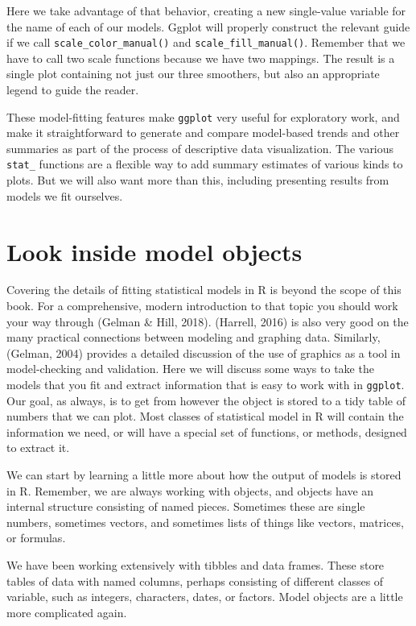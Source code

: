 \documentclass[]{book}
\begin{document}
Here we take advantage of that behavior, creating a new single-value variable for the name of each of our models. Ggplot will properly construct the relevant guide if we call \texttt{scale\_color\_manual()} and \texttt{scale\_fill\_manual()}. Remember that we have to call two scale functions because we have two mappings. The result is a single plot containing not just our three smoothers, but also an appropriate legend to guide the reader.

These model-fitting features make \texttt{ggplot} very useful for exploratory work, and make it straightforward to generate and compare model-based trends and other summaries as part of the process of descriptive data visualization. The various \texttt{stat\_} functions are a flexible way to add summary estimates of various kinds to plots. But we will also want more than this, including presenting results from models we fit ourselves.

\hypertarget{look-inside-model-objects}{%
\section{Look inside model objects}\label{look-inside-model-objects}}

Covering the details of fitting statistical models in R is beyond the scope of this book. For a comprehensive, modern introduction to that topic you should work your way through (Gelman \& Hill, 2018). (Harrell, 2016) is also very good on the many practical connections between modeling and graphing data. Similarly, (Gelman, 2004) provides a detailed discussion of the use of graphics as a tool in model-checking and validation. Here we will discuss some ways to take the models that you fit and extract information that is easy to work with in \texttt{ggplot}. Our goal, as always, is to get from however the object is stored to a tidy table of numbers that we can plot. Most classes of statistical model in R will contain the information we need, or will have a special set of functions, or methods, designed to extract it.

We can start by learning a little more about how the output of models is stored in R. Remember, we are always working with objects, and objects have an internal structure consisting of named pieces. Sometimes these are single numbers, sometimes vectors, and sometimes lists of things like vectors, matrices, or formulas.

We have been working extensively with tibbles and data frames. These store tables of data with named columns, perhaps consisting of different classes of variable, such as integers, characters, dates, or factors. Model objects are a little more complicated again.\\
\end{document}
